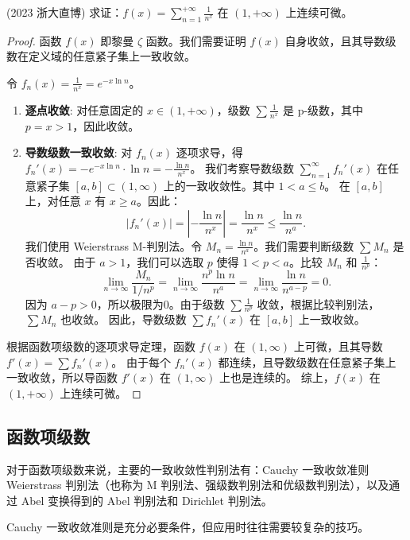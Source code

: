 \documentclass[lang=cn,10pt,thmcnt=section]{elegantbook}
\begin{document}
\begin{example}
    (2023 浙大直博) 求证：$f(x) = \sum_{n=1}^{+\infty} \frac{1}{n^x}$ 在 $(1, +\infty)$ 上连续可微。
\end{example}
\begin{proof}
    函数 $f(x)$ 即黎曼 $\zeta$ 函数。我们需要证明 $f(x)$ 自身收敛，且其导数级数在定义域的任意紧子集上一致收敛。
    
    令 $f_n(x) = \frac{1}{n^x} = e^{-x \ln n}$。
    \begin{enumerate}
        \item \textbf{逐点收敛}: 对任意固定的 $x \in (1, +\infty)$，级数 $\sum \frac{1}{n^x}$ 是 p-级数，其中 $p=x > 1$，因此收敛。
        \item \textbf{导数级数一致收敛}: 对 $f_n(x)$ 逐项求导，得 $f_n'(x) = -e^{-x \ln n} \cdot \ln n = -\frac{\ln n}{n^x}$。
        我们考察导数级数 $\sum_{n=1}^\infty f_n'(x)$ 在任意紧子集 $[a, b] \subset (1, \infty)$ 上的一致收敛性。其中 $1 < a \le b$。
        在 $[a,b]$ 上，对任意 $x$ 有 $x \ge a$。因此：
        \[ |f_n'(x)| = \left|-\frac{\ln n}{n^x}\right| = \frac{\ln n}{n^x} \le \frac{\ln n}{n^a}. \]
        我们使用 Weierstrass M-判别法。令 $M_n = \frac{\ln n}{n^a}$。我们需要判断级数 $\sum M_n$ 是否收敛。
        由于 $a>1$，我们可以选取 $p$ 使得 $1 < p < a$。比较 $M_n$ 和 $\frac{1}{n^p}$：
        \[ \lim_{n \to \infty} \frac{M_n}{1/n^p} = \lim_{n \to \infty} \frac{n^p \ln n}{n^a} = \lim_{n \to \infty} \frac{\ln n}{n^{a-p}} = 0. \]
        因为 $a-p>0$，所以极限为0。由于级数 $\sum \frac{1}{n^p}$ 收敛，根据比较判别法，$\sum M_n$ 也收敛。
        因此，导数级数 $\sum f_n'(x)$ 在 $[a,b]$ 上一致收敛。
    \end{enumerate}
    根据函数项级数的逐项求导定理，函数 $f(x)$ 在 $(1, \infty)$ 上可微，且其导数 $f'(x) = \sum f_n'(x)$。
    由于每个 $f_n'(x)$ 都连续，且导数级数在任意紧子集上一致收敛，所以导函数 $f'(x)$ 在 $(1, \infty)$ 上也是连续的。
    综上，$f(x)$ 在 $(1, +\infty)$ 上连续可微。
\end{proof}
	
\subsection{函数项级数}
对于函数项级数来说，主要的一致收敛性判别法有：Cauchy 一致收敛准则 Weierstrass 判别法（也称为 M 判别法、强级数判别法和优级数判别法），以及通过 Abel 变换得到的 Abel 判别法和 Dirichlet 判别法。

Cauchy 一致收敛准则是充分必要条件，但应用时往往需要较复杂的技巧。
\end{document}
